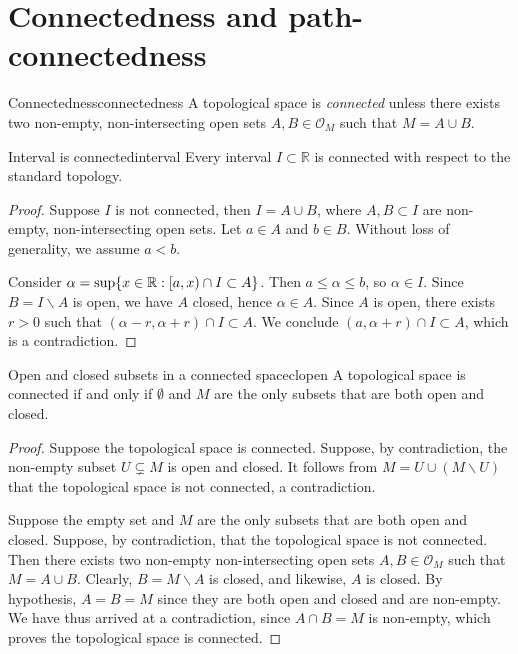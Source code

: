 \section{Connectedness and path-connectedness}
\begin{definition}{Connectedness}{connectedness}
    A topological space  is \emph{connected} unless there exists two non-empty, non-intersecting open sets \(A, B \in \mathcal{O}_M\) such that \(M = A \cup B\).
\end{definition}

\begin{theorem}{Interval is connected}{interval}
    Every interval \(I \subset \mathbb{R}\) is connected with respect to the standard topology.
\end{theorem}
\begin{proof}
    Suppose \(I\) is not connected, then \(I = A \cup B\), where \(A, B \subset I\) are non-empty, non-intersecting open sets. Let \(a \in A\) and \(b \in B\). Without loss of generality, we assume \(a < b\).

    Consider \(\alpha = \sup\{x \in \mathbb{R} : [a, x) \cap I \subset A\}\). Then \(a \leq \alpha \leq b\), so \(\alpha \in I\). Since \(B = I \smallsetminus A\) is open, we have \(A\) closed, hence \(\alpha \in A\). Since \(A\) is open, there exists \(r > 0\) such that \((\alpha - r, \alpha + r)\cap I \subset A\). We conclude \((a, \alpha+r)\cap I \subset A\), which is a contradiction.
\end{proof}

\begin{theorem}{Open and closed subsets in a connected space}{clopen}
    A topological space  is connected if and only if \(\emptyset\) and \(M\) are the only subsets that are both open and closed.
\end{theorem}
\begin{proof}
    Suppose the topological space is connected. Suppose, by contradiction, the non-empty subset \(U \subsetneq M\) is open and closed. It follows from \(M = U \cup (M\smallsetminus U)\) that the topological space is not connected, a contradiction.

    Suppose the empty set and \(M\) are the only subsets that are both open and closed. Suppose, by contradiction, that the topological space is not connected. Then there exists two non-empty non-intersecting open sets \(A,  B \in \mathcal{O}_M\) such that \(M = A \cup B\). Clearly, \(B = M\smallsetminus A\) is closed, and likewise, \(A\) is closed. By hypothesis, \(A = B = M\) since they are both open and closed and are non-empty. We have thus arrived at a contradiction, since \(A\cap B = M\) is non-empty, which proves the topological space is connected.
\end{proof}

